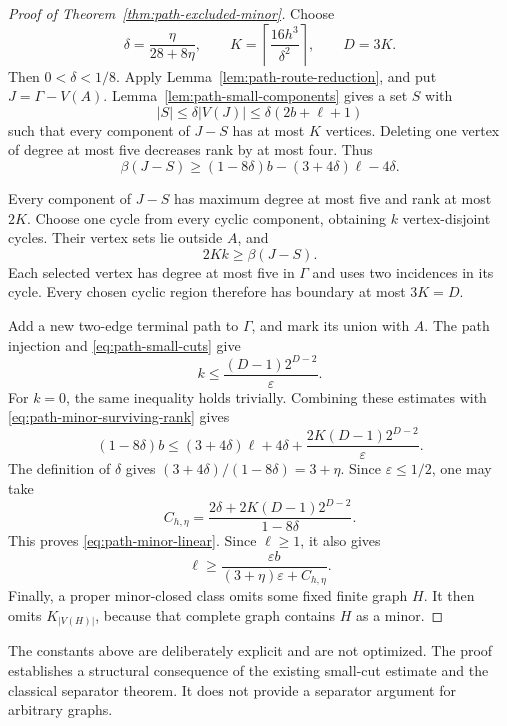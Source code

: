 \begin{proof}[Proof of Theorem~\ref{thm:path-excluded-minor}]
Choose
\[
 \delta=\frac{\eta}{28+8\eta},\qquad
 K=\left\lceil\frac{16h^3}{\delta^2}\right\rceil,
 \qquad D=3K.
\]
Then $0<\delta<1/8$.
Apply Lemma~\ref{lem:path-route-reduction}, and put $J=\Gamma-V(A)$.
Lemma~\ref{lem:path-small-components} gives a set $S$ with
\[
 |S|\le\delta|V(J)|\le\delta(2b+\ell+1)
\]
such that every component of $J-S$ has at most $K$ vertices.
Deleting one vertex of degree at most five decreases rank by at most four.
Thus
\begin{equation}\label{eq:path-minor-surviving-rank}
 \beta(J-S)\ge (1-8\delta)b-(3+4\delta)\ell-4\delta.
\end{equation}

Every component of $J-S$ has maximum degree at most five and rank at most $2K$.
Choose one cycle from every cyclic component, obtaining $k$ vertex-disjoint cycles.
Their vertex sets lie outside $A$, and
\[
 2Kk\ge\beta(J-S).
\]
Each selected vertex has degree at most five in $\Gamma$ and uses two incidences in its cycle.
Every chosen cyclic region therefore has boundary at most $3K=D$.

Add a new two-edge terminal path to $\Gamma$, and mark its union with $A$.
The path injection and \eqref{eq:path-small-cuts} give
\[
 k\le\frac{(D-1)2^{D-2}}{\varepsilon}.
\]
For $k=0$, the same inequality holds trivially.
Combining these estimates with \eqref{eq:path-minor-surviving-rank} gives
\[
 (1-8\delta)b
 \le(3+4\delta)\ell+4\delta
 +\frac{2K(D-1)2^{D-2}}{\varepsilon}.
\]
The definition of $\delta$ gives
$(3+4\delta)/(1-8\delta)=3+\eta$.
Since $\varepsilon\le1/2$, one may take
\[
 C_{h,\eta}
 =\frac{2\delta+2K(D-1)2^{D-2}}{1-8\delta}.
\]
This proves \eqref{eq:path-minor-linear}.
Since $\ell\ge1$, it also gives
\[
 \ell\ge\frac{\varepsilon b}{(3+\eta)\varepsilon+C_{h,\eta}}.
\]
Finally, a proper minor-closed class omits some fixed finite graph $H$.
It then omits $K_{|V(H)|}$, because that complete graph contains $H$ as a minor.
\end{proof}

The constants above are deliberately explicit and are not optimized.
The proof establishes a structural consequence of the existing small-cut estimate and the classical separator theorem.
It does not provide a separator argument for arbitrary graphs.
